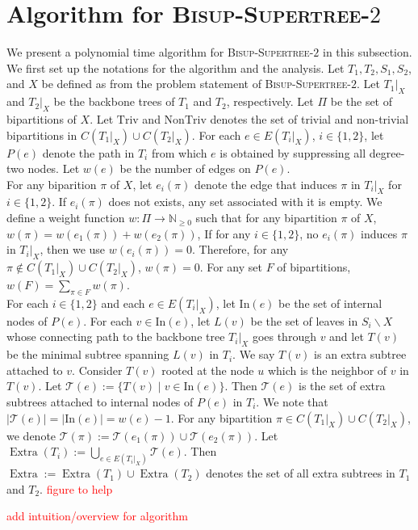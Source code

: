 \documentclass{bmcart}
\newcommand{\note}[1]{\textcolor{red}{#1}}
\newcommand{\In}{\mathrm{In}}
\newcommand{\triv}{\mathrm{Triv}}
\newcommand{\ntriv}{\mathrm{NonTriv}}
\newcommand{\bisuptwo}{\textsc{Bisup-Supertree-$2$}\xspace}
\DeclareMathOperator*{\extra}{Extra}
\begin{document}
\section{Algorithm for \bisuptwo}
We present a polynomial time algorithm for \bisuptwo in this subsection. We first set up the notations for the algorithm and the analysis. Let $T_1,T_2,S_1,S_2$, and $X$ be defined as from the problem statement of \bisuptwo. Let $T_1|_X$ and $T_2|_X$ be the backbone trees of $T_1$ and $T_2$, respectively. Let $\Pi$ be the set of bipartitions of $X$. Let $\triv$ and $\ntriv$ denotes the set of trivial and non-trivial bipartitions in $C(T_1|_X) \cup C(T_2|_X)$. For each $e \in E(T_i|_X)$, $i \in \{1,2\}$, let $P(e)$ denote the path in $T_i$ from which $e$ is obtained by suppressing all degree-two nodes. Let $w(e)$ be the number of edges on $P(e)$. \\

For any biparition $\pi$ of $X$, let $e_i(\pi)$ denote the edge that induces $\pi$ in $T_i|_X$ for $i \in \{1,2\}$. If $e_i(\pi)$ does not exists, any set associated with it is empty. We define a weight function $w:\Pi \to \mathbb{N}_{\ge 0}$ such that for any bipartition $\pi$ of $X$, $w(\pi) = w(e_1(\pi)) + w(e_2(\pi))$, If for any $i \in \{1,2\}$, no $e_i(\pi)$ induces $\pi$ in $T_i|_X$, then we use $w(e_i(\pi)) = 0$. Therefore, for any $\pi \notin C(T_1|_X) \cup C(T_2|_X)$, $w(\pi) = 0$. For any set $F$ of bipartitions, $w(F) = \sum_{\pi \in F} w(\pi)$.\\

For each $i \in \{1,2\}$ and each $e \in E(T_i|_X)$, let $\In(e)$ be the set of internal nodes of $P(e)$. For each $v \in \In(e)$, let $L(v)$ be the set of leaves in $S_i \backslash X$ whose connecting path to the backbone tree $T_i|_X$ goes through $v$ and let $T(v)$ be the minimal subtree spanning $L(v)$ in $T_i$. We say $T(v)$ is an extra subtree attached to $v$. Consider $T(v)$ rooted at the node $u$ which is the neighbor of $v$ in $T(v)$. Let $\mathcal{T}(e) := \{T(v) \mid v \in \In(e)\}$. Then $\mathcal{T}(e)$ is the set of extra subtrees attached to internal nodes of $P(e)$ in $T_i$. We note that $|\mathcal{T}(e)| = |\In(e)| = w(e)-1$. For any bipartition $\pi \in C(T_1|_X) \cup C(T_2|_X)$, we denote $\mathcal{T}(\pi) := \mathcal{T}(e_1(\pi)) \cup \mathcal{T}(e_2(\pi))$. Let $\extra(T_i) := \bigcup_{e \in E(T_i|_X)} \mathcal{T}(e)$. Then $\extra := \extra(T_1) \cup \extra(T_2)$ denotes the set of all extra subtrees in $T_1$ and $T_2$. \note{figure to help}

\note{add intuition/overview for algorithm}
\end{document}
